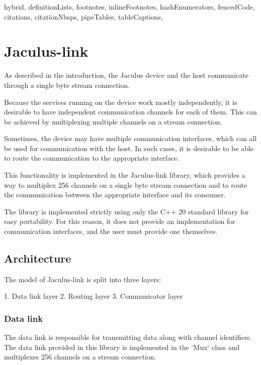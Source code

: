 \begin{markdown*}{%
  hybrid,
  definitionLists,
  footnotes,
  inlineFootnotes,
  hashEnumerators,
  fencedCode,
  citations,
  citationNbsps,
  pipeTables,
  tableCaptions,
}

\chapter{Jaculus-link} \label{chap:link}

As described in the introduction, the Jaculus device and the host communicate through a single byte stream connection.

Because the services running on the device work mostly independently, it is desirable to have independent communication channels for each of them. This can be achieved by multiplexing multiple channels on a stream connection.

Sometimes, the device may have multiple communication interfaces, which can all be used for communication with the host. In such cases, it is desirable to be able to route the communication to the appropriate interface.

This functionality is implemented in the Jaculus-link library, which provides a way to multiplex 256 channels on a single byte stream connection and to route the communication between the appropriate interface and its consumer.

The library is implemented strictly using only the C++ 20 standard library for easy portability. For this reason, it does not provide an implementation for communication interfaces, and the user must provide one themselves.

\section{Architecture}

The model of Jaculus-link is split into three layers:

1. Data link layer
2. Routing layer
3. Communicator layer

\subsection{Data link}

The data link is responsible for transmitting data along with channel identifiers. The data link provided in this library is implemented in the `Mux` class and multiplexes 256 channels on a stream connection.


\end{markdown*}
